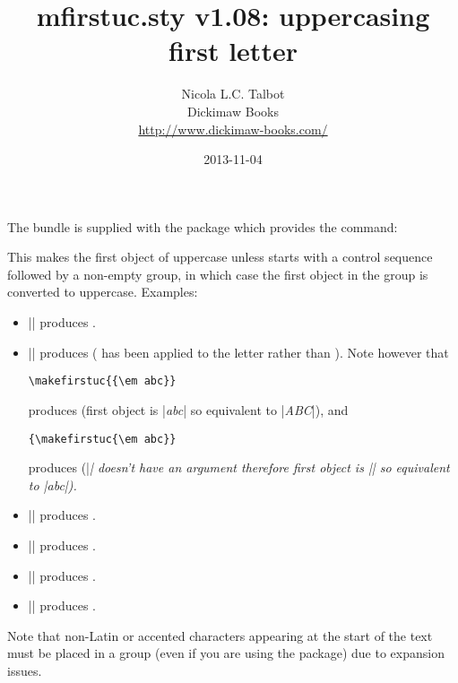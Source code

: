 \documentclass{nlctdoc}
\begin{document}
 \title{mfirstuc.sty v1.08: uppercasing first letter}
 \author{Nicola L.C. Talbot\\[10pt]
Dickimaw Books\\
\url{http://www.dickimaw-books.com/}}

 \date{2013-11-04}
 \maketitle

The  bundle is supplied with the package 
 which provides the command:
\begin{definition}[\DescribeMacro{\makefirstuc}]
\end{definition}
This makes the first object of
 uppercase unless  starts with a control
sequence followed by a non-empty group, in which case the first
object in the group is converted to uppercase. Examples:
\begin{itemize}
\item || produces .

\item || produces 
( has been applied to the letter  rather
than ). Note however that
\begin{verbatim}
\makefirstuc{{\em abc}}
\end{verbatim}
produces  (first object is |{\em abc}| so
equivalent to |\MakeUppercase{\em abc}|), and
\begin{verbatim}
{\makefirstuc{\em abc}}
\end{verbatim}
produces {} (|\em| doesn't have an argument
therefore first object is |\em| so equivalent to
|{\MakeUppercase{\em}abc}|).

\item || produces .

\item || produces .

\item || produces .

\item || produces .

\end{itemize}
Note that non-Latin or accented characters appearing at the
start of the text must be placed in a group (even if you are
using the  package) due to expansion issues.
\end{document}
